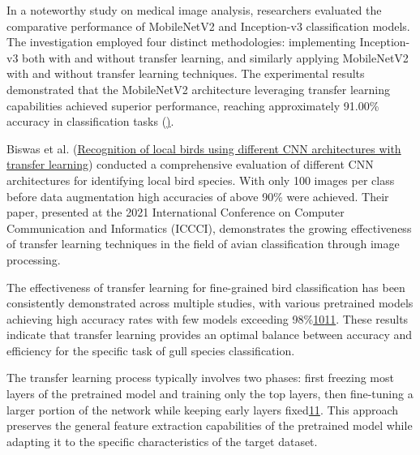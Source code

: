 \documentclass[a4paper,12pt]{report}
\begin{document}
In a noteworthy study on medical image analysis, researchers evaluated the comparative performance of MobileNetV2 and Inception-v3 classification models. The investigation employed four distinct methodologies: implementing Inception-v3 both with and without transfer learning, and similarly applying MobileNetV2 with and without transfer learning techniques. The experimental results demonstrated that the MobileNetV2 architecture leveraging transfer learning capabilities achieved superior performance, reaching approximately 91.00\% accuracy in classification tasks (\href{https://thesai.org/Publications/ViewPaper?Volume=11&Issue=8&Code=IJACSA&SerialNo=40}). 


Biswas et al. (\href{https://ieeexplore.ieee.org/document/9402304}{Recognition of local birds using different CNN architectures with transfer learning}) conducted a comprehensive evaluation of different CNN architectures for identifying local bird species. With only 100 images per class before data augmentation high accuracies of above 90\% were achieved. Their paper, presented at the 2021 International Conference on Computer Communication and Informatics (ICCCI), demonstrates the growing effectiveness of transfer learning techniques in the field of avian classification through image processing.

The effectiveness of transfer learning for fine-grained bird classification has been consistently demonstrated across multiple studies, with various pretrained models achieving high accuracy rates with few models exceeding 98\%\href{https://www.semanticscholar.org/paper/41b0718279f408654094557156d4eeeb0067b2c4}{10}\href{https://www.semanticscholar.org/paper/770ee68d1b136cd098a018a399d1f69af29faae0}{11}. These results indicate that transfer learning provides an optimal balance between accuracy and efficiency for the specific task of gull species classification.


The transfer learning process typically involves two phases: first freezing most layers of the pretrained model and training only the top layers, then fine-tuning a larger portion of the network while keeping early layers fixed\href{https://www.semanticscholar.org/paper/770ee68d1b136cd098a018a399d1f69af29faae0}{11}. This approach preserves the general feature extraction capabilities of the pretrained model while adapting it to the specific characteristics of the target dataset.
\end{document}
